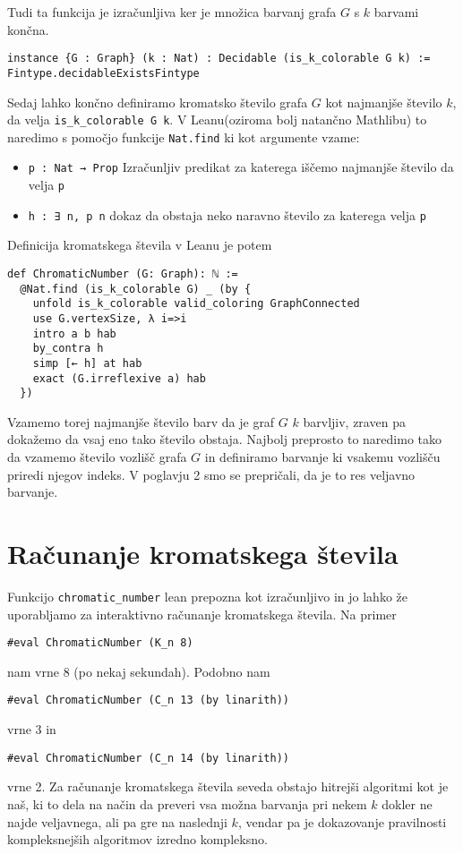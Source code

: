 \documentclass[mat1]{fmfdelo}
\begin{document}
Tudi ta funkcija je izračunljiva ker je množica barvanj grafa $G$ s $k$ barvami končna.
\begin{lstlisting}
instance {G : Graph} (k : Nat) : Decidable (is_k_colorable G k) := Fintype.decidableExistsFintype
\end{lstlisting}

Sedaj lahko končno definiramo kromatsko število grafa $G$ kot najmanjše število $k$, da velja
\lstinline{is_k_colorable G k}. V Leanu(oziroma bolj natančno Mathlibu) to naredimo s pomočjo funkcije \lstinline{Nat.find}
ki kot argumente vzame:
\begin{itemize}
    \item \lstinline{p : Nat → Prop} Izračunljiv predikat za katerega iščemo najmanjše število da velja \lstinline{p}
    \item \lstinline{h : ∃ n, p n} dokaz da obstaja neko naravno število za katerega velja \lstinline{p}
\end{itemize}

Definicija kromatskega števila v Leanu je potem
\begin{lstlisting}
def ChromaticNumber (G: Graph): ℕ :=
  @Nat.find (is_k_colorable G) _ (by {
    unfold is_k_colorable valid_coloring GraphConnected
    use G.vertexSize, λ i=>i
    intro a b hab
    by_contra h
    simp [← h] at hab
    exact (G.irreflexive a) hab
  })
\end{lstlisting}
Vzamemo torej najmanjše število barv da je graf $G$ $k$ barvljiv, zraven pa dokažemo da vsaj eno tako število obstaja.
Najbolj preprosto to naredimo tako da vzamemo število vozlišč grafa $G$ in definiramo barvanje ki vsakemu vozlišču priredi njegov indeks.
V poglavju 2 smo se prepričali, da je to res veljavno barvanje.





\section{Računanje kromatskega števila}
Funkcijo \lstinline{chromatic_number} lean prepozna kot izračunljivo in jo lahko že uporabljamo za interaktivno računanje
kromatskega števila. Na primer
\begin{lstlisting}
#eval ChromaticNumber (K_n 8)
\end{lstlisting}
nam vrne 8 (po nekaj sekundah). Podobno nam
\begin{lstlisting}
#eval ChromaticNumber (C_n 13 (by linarith))
\end{lstlisting}
vrne 3 in
\begin{lstlisting}
#eval ChromaticNumber (C_n 14 (by linarith))
\end{lstlisting}
vrne 2. Za računanje kromatskega števila seveda obstajo hitrejši algoritmi kot je naš, 
ki to dela na način da preveri vsa možna barvanja pri nekem $k$ dokler ne najde veljavnega, ali pa gre 
na naslednji $k$, vendar pa je dokazovanje pravilnosti kompleksnejših algoritmov izredno kompleksno.
\end{document}
